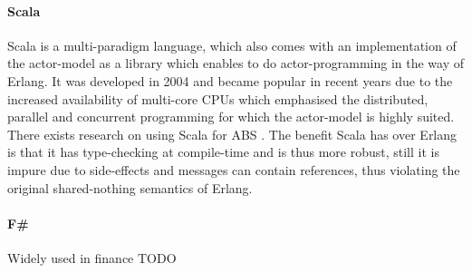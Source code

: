 \paragraph{Scala} Scala is a multi-paradigm language, which also comes with an implementation of the actor-model as a library which enables to do actor-programming in the way of Erlang. It was developed in 2004 and became popular in recent years due to the increased availability of multi-core CPUs which emphasised the distributed, parallel and concurrent programming for which the actor-model is highly suited. There exists research on using Scala for ABS \cite{krzywicki_massively_2015, todd_multi-agent_nodate}. The benefit Scala has over Erlang is that it has type-checking at compile-time and is thus more robust, still it is impure due to side-effects and messages can contain references, thus violating the original shared-nothing semantics of Erlang.

\paragraph{F\#} Widely used in finance TODO 